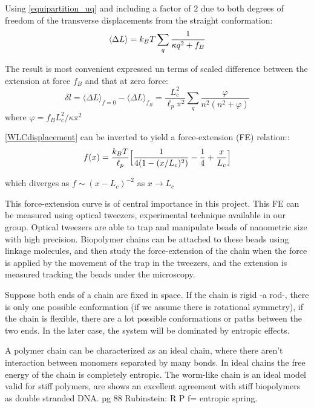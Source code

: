 Using \ref{equipartition_uq} and including a factor of $2$ due to both
degrees of freedom of the transverse displacements from the straight
conformation:
\begin{equation}\label{deltaLmean}
\langle\Delta L\rangle = k_B{}T\sum_q \frac{1}{\kappa{}q^2+f_B}
\end{equation}

The result is most convenient expressed un terms of scaled difference between
the extension at force $f_B$ and that at zero force\citep{storm_nonlinear_2005}:
\begin{equation}\label{WLCdisplacement}
\delta l=\langle\Delta L\rangle_{f=0} - \langle\Delta L\rangle_{f_B} =
\frac{L_c^2}{\ell_p\pi^2} \sum_q \frac{\varphi}{n^2(n^2 + \varphi)}
\end{equation} 
where $\varphi = f_BL_c^2/\kappa{}\pi^2$

\ref{WLCdisplacement} can be inverted to yield a force-extension (FE)
relation:\citep{marko_stretching_1995}:
\begin{equation}\label{FEMarko}
f(x)=\frac{k_B{}T}{\ell_p} \Big[ \frac{1}{4(1-(x/L_c)^2)}
-\frac{1}{4}+\frac{x}{L_c} \Big]
\end{equation}

which diverges as $f \sim (x - L_c)^{-2}$ as $x\rightarrow L_c$

This force-extension curve is of central importance in this project. This FE can
be measured using optical tweezers, experimental technique available in our
group. Optical tweezers are able to trap and manipulate beads of nanometric
size with high precision\cite{dasdsa}. Biopolymer chains can be attached to
these beads using linkage molecules, and then study the force-extension of the
chain when the force is applied by the movement of the trap in the tweezers, and
the extension is measured tracking the beads under the microscopy.



 Suppose both ends of a chain
are fixed in space. If the chain is rigid -a rod-, there is only one possible conformation
(if we assume there is rotational symmetry), if the chain is flexible, there
are a lot possible conformations or paths between the two ends. In the later
case, the system will be dominated by entropic effects.

A polymer chain can be characterized as an ideal chain, where there aren't
interaction between monomers separated by many bonds. In ideal chains the free
energy of the chain is completely entropic. The worm-like chain is an ideal
model valid for stiff polymers, are shows an excellent agreement with stiff
biopolymers as double stranded DNA.
 pg 88 Rubinstein:
R
P
f= entropic spring.

